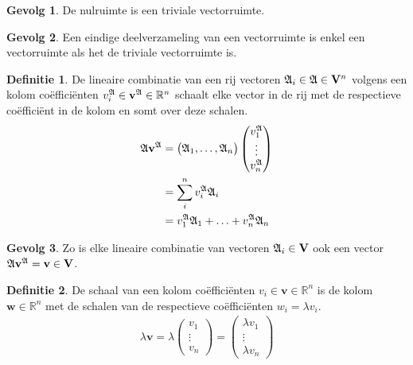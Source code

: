 \documentclass{amsart}
\theoremstyle{definition}
\newtheorem{dfn}{Definitie}[section]
\newtheorem{csq}{Gevolg}[section]
\newcommand{\realnums}{\mathbb{R}}
\newcommand{\realn}[1][n]{\realnums^{#1}}
\newcommand{\vecspace}[1][v]{\mathrm{\mathbf{\MakeUppercase#1}}}
\newcommand{\vecspacen}[1][n]{\vecspace^#1}
\newcommand{\vvec}[1][v]{\mathbf{#1}}
\newcommand{\vecrow}[1][a]{\mathfrak{\MakeUppercase{#1}}}
\newcommand{\rvec}[2][i]{{#2}_{#1}}
\newcommand{\rvecr}[2][i]{\rvec[#1]{\vecrow[#2]}}
\newcommand{\rveci}[1][i]{\rvecr[#1]{a}}
\newcommand{\cvec}[2]{{#1}^{#2}}
\newcommand{\cvecv}[2][v]{\cvec{\vvec[#1]}{#2}}
\newcommand{\cvecva}[1][a]{\cvecv{\vecrow[#1]}}
\newcommand{\vcord}[3]{{#1}_{#2}^{#3}}
\newcommand{\vcordv}[3][v]{\vcord{#1}{#2}{\vecrow[#3]}}
\newcommand{\vcordvi}[2][i]{\vcordv{#1}{#2}}
\newcommand{\vcordvia}[1][i]{\vcordvi[#1]{a}}
\begin{document}
\begin{csq}
    De nulruimte is een triviale vectorruimte.
\end{csq}

\begin{csq}
    Een eindige deelverzameling van een vectorruimte is enkel een vectorruimte als het de triviale vectorruimte is.
\end{csq}

\begin{dfn}
    De lineaire combinatie van een rij vectoren $\rveci \in \vecrow \in \vecspacen$ volgens een kolom coëfficiënten $\vcordvia \in \cvecva \in \mathbb{R}^n$
    schaalt elke vector in de rij met de respectieve coëfficiënt in de kolom en somt over deze schalen.
    \begin{align*}
        \vecrow \cvecva
         & =
        \begin{pmatrix}
            \rveci[1], \ldots, \rveci[n]
        \end{pmatrix}
        \begin{pmatrix}
            \vcordvia[1] \\
            \vdots       \\
            \vcordvia[n]
        \end{pmatrix}
        \\ & = \sum_i^n \vcordvia \rveci
        \\ & = \vcordvia[1] \rveci[1] + \ldots + \vcordvia[n] \rveci[n]
    \end{align*}
\end{dfn}

\begin{csq}
    Zo is elke lineaire combinatie van vectoren $\rveci \in \vecspace$ ook een vector $\vecrow \cvecva = \vvec \in \vecspace$.
\end{csq}

\begin{dfn}
    De schaal van een kolom coëfficiënten $v_i \in \vvec \in \realn$ is de kolom $\vvec[w] \in \realn$ met de schalen van de respectieve coëfficiënten ${w}_i = \lambda {v}_i$.
    \begin{align*}
        \lambda \vvec =
        \lambda
        \begin{pmatrix}
            v_1    \\
            \vdots \\
            v_n
        \end{pmatrix}
        =
        \begin{pmatrix}
            \lambda v_1 \\
            \vdots      \\
            \lambda v_n
        \end{pmatrix}
    \end{align*}
\end{dfn}
\end{document}
